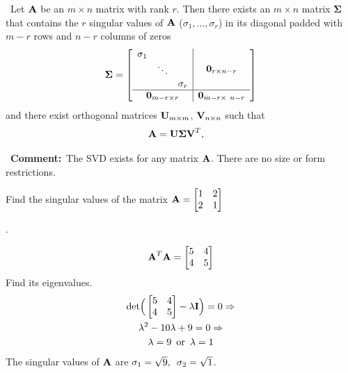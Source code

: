 \documentclass[a4paper]{article}
\numberwithin{equation}{section} %
\newcommand{\hquad}{\hskip0.5em\relax}%
\newcommand{\B}[1]{\textbf{\textup{#1}}} %
\newcommand{\mycomment}[1]{\begin{leftrightbox}\Pointinghand~\textbf{Comment:}~#1 \end{leftrightbox}}
\begin{document}
\begin{shaded*}
\begin{theorem}
\cite{lay}~Let $\B{A}$ be an $m \times n$ matrix with rank $r$. Then there exists an $m \times n$ matrix $\boldsymbol{\Sigma}$ that contains the $r$ singular values of $\B{A}$ ($\sigma_1,\ldots, \sigma_r$) in its diagonal padded with $m-r$ rows and $n-r$ columns of zeros
\begin{equation}
\boldsymbol{\Sigma}=
\begin{bmatrix}
\begin{array}{c|c}
\begin{matrix}\sigma_1 & & \\ & \ddots & \\ & & \sigma_r\end{matrix} & \B{0}_{r\times n-r} \\
\hline
\B{0}_{m-r\times r} & \B{0}_{m-r\times\ n-r}
\end{array}
\end{bmatrix}
\end{equation}
and there exist orthogonal matrices $\B{U}_{m \times m}$, $\B{V}_{n \times n}$ such that
\begin{equation}
\B{A}=\B{U}\boldsymbol{\Sigma}\B{V}^T, \quad 
\end{equation}
\label{theorem:svd}
\end{theorem}
\end{shaded*}

\mycomment{The SVD exists for any matrix $\B{A}$. There are no size or form restrictions.}

\begin{exmp}
Find the singular values of the matrix $\B{A}=\begin{bmatrix} 1 & 2\\2 & 1 \end{bmatrix}$\end{exmp}.
\begin{TheSolution}
\[
\B{A}^T\B{A}=\begin{bmatrix}5&4\\4&5 \end{bmatrix}
\]
Find its eigenvalues.
\[
\begin{gathered}
\textup{det}\Big(\begin{bmatrix}5&4\\4&5 \end{bmatrix} -\lambda \B{I}\Big)=0 \Rightarrow \\
\lambda^2-10\lambda+9=0\Rightarrow \\
\lambda=9 \hquad \textup{or} \hquad \lambda = 1
\end{gathered}
\]
The singular values of $\B{A}$ are $\sigma_1=\sqrt{9}, \hquad \sigma_2=\sqrt{1}$.
\end{TheSolution}
\end{document}
